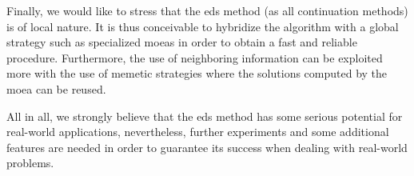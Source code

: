 Finally, we would like to stress that the \gls{eds} method (as all continuation methods) is of local nature. It is thus conceivable to hybridize the algorithm with a global strategy such as specialized \glspl{moea} in order to obtain a fast and reliable procedure. Furthermore, the use of neighboring information can be exploited more with the use of memetic strategies where the solutions computed by the \gls{moea} can be reused.

All in all, we strongly believe that the \gls{eds} method has some serious potential for real-world applications, nevertheless, further experiments and some additional features are needed in order to guarantee its success when dealing with real-world problems.